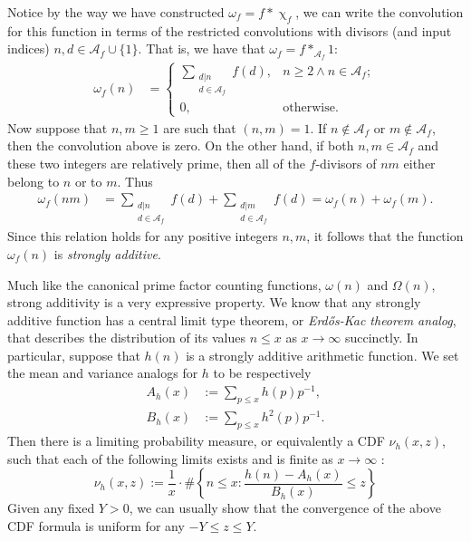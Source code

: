 \documentclass[11pt,reqno,a4letter]{article}
\numberwithin{figure}{section}
\numberwithin{table}{section}
\renewcommand{\chi}{\upchi}
\theoremstyle{plain}
\numberwithin{theorem}{section}
\theoremstyle{definition}
\begin{document}
Notice by the way we have constructed $\omega_f = f \ast \chi_f$, 
we can write the convolution for this function in terms of 
the restricted convolutions with divisors (and input indices) 
$n,d \in \mathcal{A}_f \cup \{1\}$. 
That is, we have that $\omega_f = f \ast_{\mathcal{A}_f} 1$: 
\begin{align*}
\omega_f(n) & = \begin{cases}
     \sum\limits_{\substack{d|n \\ d \in \mathcal{A}_f}} f(d), & n \geq 2 \wedge n \in \mathcal{A}_f; \\ 
     0, & \mathrm{otherwise.}
     \end{cases}
\end{align*}
Now suppose that $n, m \geq 1$ are such that $(n,m) = 1$. 
If $n \notin \mathcal{A}_f$ or $m \notin \mathcal{A}_f$, then the convolution 
above is zero. On the other hand, if both $n,m \in \mathcal{A}_f$ and these 
two integers are relatively prime, then all of the $f$-divisors of $nm$ either 
belong to $n$ or to $m$. Thus 
\begin{align*} 
\omega_f(nm) & = \sum_{\substack{d|n \\ d \in \mathcal{A}_f}} f(d) + 
     \sum_{\substack{d|m \\ d \in \mathcal{A}_f}} f(d) = 
     \omega_f(n) + \omega_f(m). 
\end{align*}
Since this relation holds for any positive integers $n,m$, it follows that
the function $\omega_f(n)$ is \emph{strongly additive}. 

Much like the canonical prime factor counting functions, $\omega(n)$ and $\Omega(n)$, 
strong additivity is a very expressive property. We know that any 
strongly additive function has a central limit type theorem, or 
\emph{Erd\H{o}s-Kac theorem analog}, that describes the distribution of 
its values $n \leq x$ as $x \rightarrow \infty$ succinctly. 
In particular, suppose that $h(n)$ is a strongly additive arithmetic 
function. We set the mean and variance analogs for $h$ to be respectively 
\begin{align*}
A_h(x) & := \sum_{p \leq x} h(p) p^{-1}, \\ 
B_h(x) & := \sum_{p \leq x} h^2(p) p^{-1}. 
\end{align*}
Then there is a limiting probability measure, or equivalently a CDF 
$\nu_h(x, z)$, such that 
each of the following limits exists and is finite as $x \rightarrow \infty$ 
\cite[\S 1.7]{IWANIEC-KOWALSKI}: 
\[
\nu_h(x, z) := \frac{1}{x} \cdot \#\left\{n \leq x: \frac{h(n) - A_h(x)}{B_h(x)} \leq z\right\}
\]
Given any fixed $Y > 0$, we can usually show that the convergence of the above CDF formula is 
uniform for any $-Y \leq z \leq Y$. 
\end{document}
